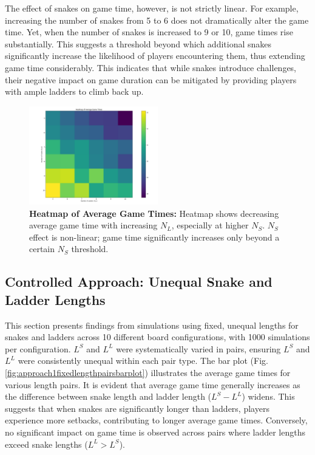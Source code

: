 The effect of snakes on game time, however, is not strictly linear. For example, increasing the number of snakes from 5 to 6 does not dramatically alter the game time. Yet, when the number of snakes is increased to 9 or 10, game times rise substantially. This suggests a threshold beyond which additional snakes significantly increase the likelihood of players encountering them, thus extending game time considerably. This indicates that while snakes introduce challenges, their negative impact on game duration can be mitigated by providing players with ample ladders to climb back up.

\begin{figure}[th]
	\centering
	\includegraphics[width=0.5\textwidth]{"../Chapter 1/Heatmap"}
	\caption{\textbf{Heatmap of Average Game Times:} Heatmap shows decreasing average game time with increasing $N_L$, especially at higher $N_S$. $N_S$ effect is non-linear; game time significantly increases only beyond a certain $N_S$ threshold.}
	\label{fig:heatmap}
\end{figure}


\subsection{Controlled Approach: Unequal Snake and Ladder Lengths}

This section presents findings from simulations using fixed, unequal lengths for snakes and ladders across 10 different board configurations, with 1000 simulations per configuration. $L^S$ and $L^L$ were  systematically varied in pairs, ensuring $L^S$ and $L^L$ were consistently unequal within each pair type. The bar plot (Fig. \ref{fig:approach1fixedlengthpairsbarplot}) illustrates the average game times for various length pairs. It is evident that average game time generally increases as the difference between snake length and ladder length ($L^S - L^L$) widens. This suggests that when snakes are significantly longer than ladders, players experience more setbacks, contributing to longer average game times. Conversely, no significant impact on game time is observed across pairs where ladder lengths exceed snake lengths ($L^L > L^S$).

